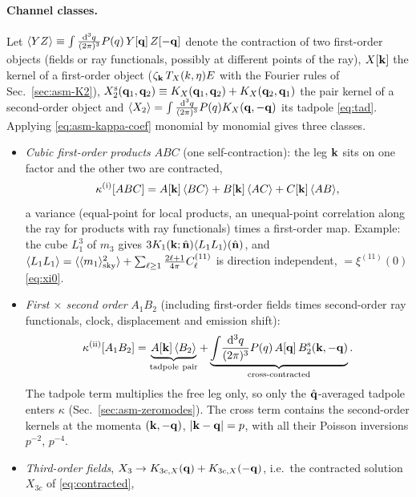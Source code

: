 \paragraph{Channel classes.}  Let $\langle Y Z\rangle\equiv\int\frac{\mathrm d^3q}{(2\pi)^3}P(q)\,Y[\mathbf q]\,Z[-\mathbf q]$ denote the contraction of two
first-order objects (fields or ray functionals, possibly at different points of the ray), $X[\mathbf k]$ the kernel of a first-order object
($\zeta_\mathbf k\,T_X(k,\eta)E$ with the Fourier rules of Sec.~\ref{sec:asm-K2}), $X^{\rm s}_2(\mathbf q_1,\mathbf q_2)\equiv K_X(\mathbf q_1,\mathbf q_2)+K_X(\mathbf q_2,\mathbf q_1)$ the
pair kernel of a second-order object and $\langle X_2\rangle=\int\frac{\mathrm d^3q}{(2\pi)^3}P(q)K_X(\mathbf q,-\mathbf q)$ its tadpole \eqref{eq:tad}.  Applying
\eqref{eq:asm-kappa-coef} monomial by monomial gives three classes.
\begin{itemize}
\item[(i)] \emph{Cubic first-order products} $ABC$ (one self-contraction): the leg $\mathbf k$ sits on one factor and the other two are contracted,
\begin{equation}
\kappa^{\rm(i)}[ABC]=A[\mathbf k]\,\langle BC\rangle+B[\mathbf k]\,\langle AC\rangle+C[\mathbf k]\,\langle AB\rangle ,
\label{eq:asm-classi}
\end{equation}
a variance (equal-point for local products, an unequal-point correlation along the ray for products with ray functionals) times a first-order
map.  Example: the cube $L_1^3$ of $m_3$ gives $3K_1(\mathbf k;\hat{\mathbf n})\langle L_1L_1\rangle(\hat{\mathbf n})$, and $\langle L_1L_1\rangle=\langle\langle m_1\rangle_{\rm sky}^2\rangle+\sum_{\ell\ge1}\frac{2\ell+1}{4\pi}C^{(11)}_\ell$
is direction independent, $=\xi^{(11)}(0)$ \eqref{eq:xi0}.
\item[(ii)] \emph{First $\times$ second order} $A_1B_2$ (including first-order fields times second-order ray functionals, clock, displacement
and emission shift):
\begin{equation}
\kappa^{\rm(ii)}[A_1B_2]=\underbrace{A[\mathbf k]\,\langle B_2\rangle}_{\rm tadpole\ pair}
+\underbrace{\int\!\frac{\mathrm d^3q}{(2\pi)^3}P(q)\,A[\mathbf q]\,B^{\rm s}_2(\mathbf k,-\mathbf q)}_{\rm cross\text{-}contracted}.
\label{eq:asm-classii}
\end{equation}
The tadpole term multiplies the free leg only, so only the $\hat{\mathbf q}$-averaged tadpole enters $\kappa$ (Sec.~\ref{sec:asm-zeromodes}).  The cross term contains
the second-order kernels at the momenta $(\mathbf k,-\mathbf q)$, $|\mathbf k-\mathbf q|=p$, with all their Poisson inversions $p^{-2}$, $p^{-4}$.
\item[(iii)] \emph{Third-order fields}, $X_3\to K_{3c,X}(\mathbf q)+K_{3c,X}(-\mathbf q)$, i.e.\ the contracted solution $X_{3c}$ of \eqref{eq:contracted},

\end{itemize}
